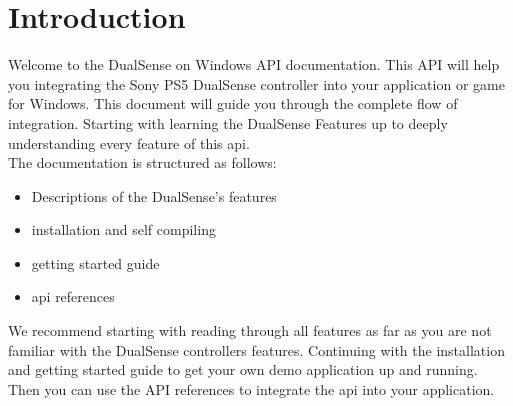 \section{Introduction}
Welcome to the DualSense on Windows API documentation. This API will help you integrating the Sony PS5 DualSense controller into your application or game for Windows. This document will guide you through the complete flow of integration. Starting with learning the DualSense Features up to deeply understanding every feature of this api.\\
The documentation is structured as follows:
\begin{itemize}
	\item Descriptions of the DualSense's features
	\item installation and self compiling
	\item getting started guide
	\item api references
\end{itemize}

We recommend starting with reading through all features as far as you are not familiar with the DualSense controllers features. Continuing with the installation and getting started guide to get your own demo application up and running. Then you can use the API references to integrate the api into your application.

\newpage